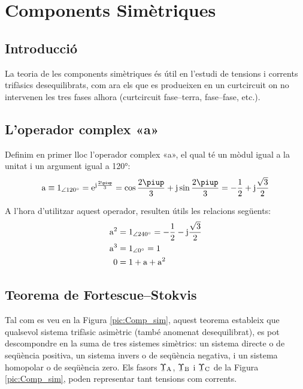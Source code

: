 \chapter{Components Simètriques}  \label{sec:comp-sim}

\section{Introducció}
La teoria de les components simètriques és útil en l'estudi de
tensions i corrents trifàsics
 desequilibrats, com ara els que es produeixen en un curtcircuit on no intervenen les tres
 fases alhora (curtcircuit fase--terra, fase--fase, etc.).

\section{L'operador complex «a»}

Definim en primer lloc l'operador complex «a», el qual té un mòdul
igual a la unitat i un argument igual a \ang{120}: 
\begin{equation}
   \au \equiv \numpd{1}{120} = \eu^{\ju\frac{2\piup}{3}} =
   \cos \frac{2\piup}{3} + \ju \sin \frac{2\piup}{3} = - \frac{1}{2} + \ju \frac{\sqrt{3}}{2}
\end{equation}

A l'hora d'utilitzar aquest operador, resulten útils les relacions
següents:
\begin{subequations}
\begin{align}
    \mathrm{a}^2 &= \num{1}_{\angle\ang{240}}= - \frac{1}{2} - \mathrm{j} \frac{\sqrt{3}}{2} \\
    \mathrm{a}^3 &= \num{1}_{\angle\ang{0}} = 1 \\
    0 &= 1+ \mathrm{a} + \mathrm{a}^2
 \end{align}
\end{subequations}

\section{\texorpdfstring{Teorema de Fortescue--Stokvis}{Teorema de Fortescue-Stokvis}}

Tal com es veu en la Figura \vref{pic:Comp_sim}, aquest teorema
estableix que qualsevol sistema trifàsic asimètric (també anomenat
desequilibrat),  es pot descompondre  en la suma de tres sistemes
simètrics: un sistema directe o de seqüència positiva, un sistema
invers o de seqüència negativa, i un sistema homopolar o de
seqüència zero. Els fasors $\cmplx{\Upsilon}\ped{A}$,
$\cmplx{\Upsilon}\ped{B}$ i $\cmplx{\Upsilon}\ped{C}$ de la Figura \vref{pic:Comp_sim}, poden representar tant
tensions com corrents.

